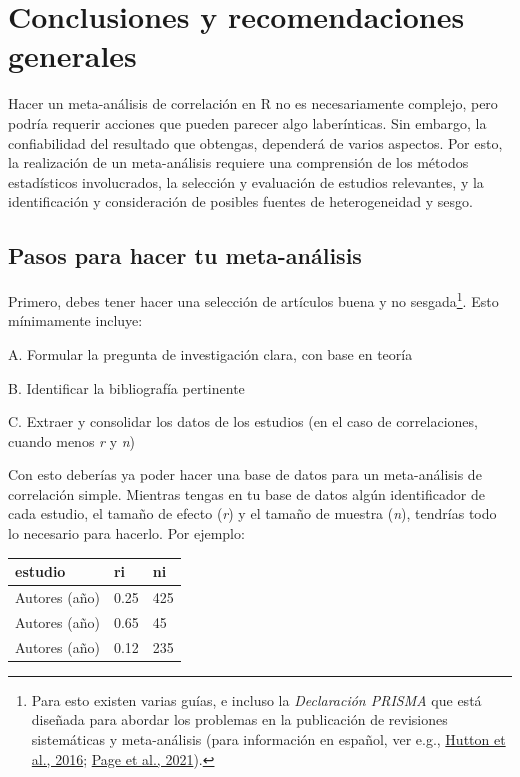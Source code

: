 \documentclass[
  bookmarksnumbered]{article}
\begin{document}
\hypertarget{conclusiones-y-recomendaciones-generales}{%
\section{Conclusiones y recomendaciones generales}\label{conclusiones-y-recomendaciones-generales}}

Hacer un meta-análisis de correlación en R no es necesariamente complejo, pero podría requerir acciones que pueden parecer algo laberínticas. Sin embargo, la confiabilidad del resultado que obtengas, dependerá de varios aspectos. Por esto, la realización de un meta-análisis requiere una comprensión de los métodos estadísticos involucrados, la selección y evaluación de estudios relevantes, y la identificación y consideración de posibles fuentes de heterogeneidad y sesgo.

\hypertarget{pasos-para-hacer-tu-meta-anuxe1lisis}{%
\subsection{Pasos para hacer tu meta-análisis}\label{pasos-para-hacer-tu-meta-anuxe1lisis}}

Primero, debes tener hacer una selección de artículos buena y no sesgada\footnote{Para esto existen varias guías, e incluso la \emph{Declaración PRISMA} que está diseñada para abordar los problemas en la publicación de revisiones sistemáticas y meta-análisis (para información en español, ver e.g., \protect\hyperlink{ref-huttonExtensionDeclaracionPRISMA2016}{Hutton et al., 2016}; \protect\hyperlink{ref-pageDeclaracionPRISMA20202021}{Page et al., 2021}).}. Esto mínimamente incluye:

A. Formular la pregunta de investigación clara, con base en teoría

B. Identificar la bibliografía pertinente

C. Extraer y consolidar los datos de los estudios (en el caso de correlaciones, cuando menos \emph{r} y \emph{n})

Con esto deberías ya poder hacer una base de datos para un meta-análisis de correlación simple. Mientras tengas en tu base de datos algún identificador de cada estudio, el tamaño de efecto (\emph{r}) y el tamaño de muestra (\emph{n}), tendrías todo lo necesario para hacerlo. Por ejemplo:

\begin{longtable}[]{@{}lll@{}}
\toprule()
estudio & ri & ni \\
\midrule()
\endhead
Autores (año) & 0.25 & 425 \\
Autores (año) & 0.65 & 45 \\
Autores (año) & 0.12 & 235 \\
\bottomrule()
\end{longtable}
\end{document}
